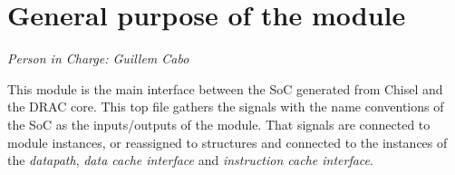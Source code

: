 \newpage
\section{General purpose of the module}
\textit{Person in Charge: Guillem Cabo}

This module is the main interface between the SoC generated from Chisel and the DRAC core.
This top file gathers the signals with the name conventions of the SoC as the inputs/outputs of the module. That signals are connected to module instances, or reassigned to structures and connected to the instances of the \emph{datapath}, \emph{data cache interface} and \emph{instruction cache interface}.
